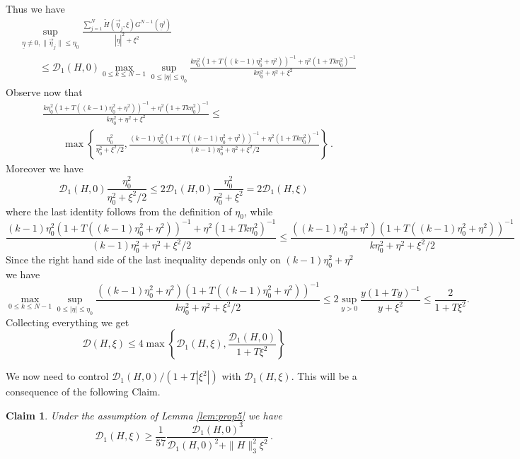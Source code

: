 \documentclass{article}
\newcommand\calD{{\mathcal D}}
\newcommand \ul[1]{\underline{#1}}
\renewcommand\v[1]{\vec{#1}}
\newcommand\set[1]{\left\{ #1 \right\}}
\newtheorem{myclaim}{Claim}
\begin{document}
Thus we have 
\[
\begin{aligned}
&\sup_{\ul\eta \ne 0, \|\v\eta_j\| \leq \eta_0} \frac{\sum_{j = 1}^N \widetilde H(\v\eta_j, \xi) G^{N -  1}(\ul\eta^j)}
{| \ul\eta|^2 + \xi^2}  \\
&\qquad\leq \calD_1(H,0)\max_{0 \leq k \leq N - 1} \sup_{0 \leq |\eta| \leq \eta_0} 
\frac{k\eta_0^2(1+T((k - 1)\eta_0^2 + 
\eta^2))^{-1} + \eta^2(1+T k \eta_0^2)^{-1}}{k\eta_0^2 + \eta^2 + \xi^2}
\end{aligned}
\]
Observe now that
\[
\begin{aligned}
&\frac{k\eta_0^2(1+T((k - 1)\eta_0^2 + 
\eta^2))^{-1} + \eta^2(1+T k \eta_0^2)^{-1}}{k\eta_0^2 + \eta^2 + \xi^2}
\leq\\
&\qquad\max\set{\frac{\eta_0^2}{\eta_0^2+\xi^2/2}, 
\frac{(k-1)\eta_0^2(1+T((k - 1)\eta_0^2 + 
\eta^2))^{-1} + \eta^2(1+T k \eta_0^2)^{-1}}{(k-1)\eta_0^2 + \eta^2 + \xi^2/2}}\, .
\end{aligned}
\]
Moreover we have
\[
\calD_1(H,0)\frac{\eta_0^2}{\eta_0^2+\xi^2/2}\leq 2\calD_1(H,0)\frac{\eta_0^2}{\eta_0^2+\xi^2}=2\calD_1(H,\xi)
\]
where the last identity follows from the definition of $\eta_0$, while
\[
\frac{(k-1)\eta_0^2(1+T((k - 1)\eta_0^2 + 
\eta^2))^{-1} + \eta^2(1+T k \eta_0^2)^{-1}}{(k-1)\eta_0^2 + \eta^2 + \xi^2/2}
\leq 
\frac{((k-1)\eta_0^2+\eta^2)(1+T((k - 1)\eta_0^2 + 
\eta^2))^{-1} }{k\eta_0^2 + \eta^2 + \xi^2/2}
\]
Since the right hand side of the last inequality depends only on $(k-1)\eta_0^2+\eta^2$ we have
\[
\max_{0 \leq k \leq N - 1} \sup_{0 \leq |\eta| \leq \eta_0} 
\frac{((k-1)\eta_0^2+\eta^2)(1+T((k - 1)\eta_0^2 + 
\eta^2))^{-1} }{k\eta_0^2 + \eta^2 + \xi^2/2}
\leq 
2\sup_{y>0}\frac{y(1+T y)^{-1}}{y+\xi^2}
\leq \frac{2}{1+T\xi^2}.
\]
Collecting everything we get
\[
\calD(H,\xi)\leq4\max\set{\calD_1(H,\xi),\frac{\calD_1(H,0)}{1+T\xi^2}}
\]

We now need to control $\calD_1(H,0)/(1+T|\xi^2|)$ with $\calD_1(H,\xi)$. This will be a consequence of the following Claim. 

\begin{myclaim}\label{claim:hr}
Under the assumption of Lemma \ref{lem:prop5} we have
\[
\calD_1(H,\xi)\geq \frac 1{57}\frac{\calD_1(H,0)^3}{\calD_1(H,0)^2+\|H\|_3^2\xi^2}\, .
\]
\end{myclaim}
\end{document}

